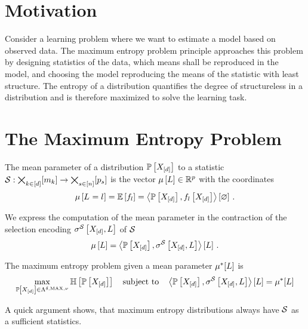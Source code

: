 \documentclass[aps,onecolumn,nofootinbib,pra]{article}
\begin{document}
    \section{Motivation}

    Consider a learning problem where we want to estimate a model based on observed data.
    The maximum entropy problem principle approaches this problem by designing statistics of the data, which means shall be reproduced in the model, and choosing the model reproducing the means of the statistic with least structure.
    The entropy of a distribution quantifies the degree of structureless in a distribution and is therefore maximized to solve the learning task.


    \section{The Maximum Entropy Problem}

    The mean parameter of a distribution $\mathbb{P}\left[X_{[d]}\right]$ to a statistic $\mathcal{S}:\bigtimes_{k\in[d]}[m_{k}]\rightarrow\bigtimes_{s\in[n]}[p_{s}]$ is the vector $\mu\left[L\right]\in\mathbb{R}^p$ with the coordinates
    \begin{align*}
        \mu\left[L_{}=l_{}\right] = \mathbb{E}\left[f_{l}\right] = \left\langle \mathbb{P}\left[X_{[d]}\right],f_{l}\left[X_{[d]}\right]\right\rangle \left[ \varnothing \right] \, .
    \end{align*}

    We express the computation of the mean parameter in the contraction of the selection encoding $\sigma^{\mathcal{S}}\left[X_{[d]},L\right]$ of $\mathcal{S}$
    \begin{align*}
        \mu\left[L\right] = \left\langle \mathbb{P}\left[X_{[d]}\right],\sigma^{\mathcal{S}}\left[X_{[d]},L\right]\right\rangle \left[ L \right] \, .
    \end{align*}

    The maximum entropy problem given a mean parameter $\mu^*[L]$ is
    \begin{align*}
        \max_{\mathbb{P}\left[X_{[d]}\right]\in\Lambda^{\delta,\mathrm{MAX},\nu}} \mathbb{H}\left[\mathbb{P}\left[X_{[d]}\right]\right] \quad \text{subject to} \quad \left\langle \mathbb{P}\left[X_{[d]}\right],\sigma^{\mathcal{S}}\left[X_{[d]},L\right]\right\rangle \left[ L \right] = \mu^*[L]
    \end{align*}

    A quick argument shows, that maximum entropy distributions always have $\mathcal{S}$ as a sufficient statistics.
\end{document}
